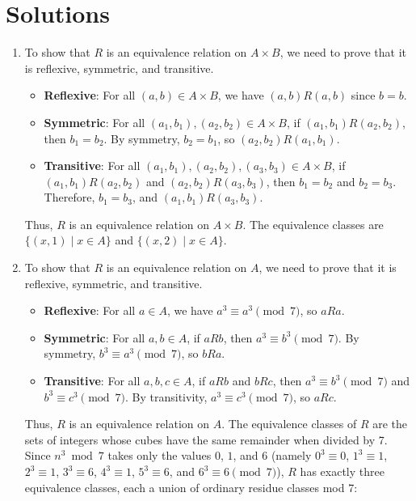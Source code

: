 
\section*{Solutions}

\begin{enumerate}
\item
To show that $R$ is an equivalence relation on $A \times B$, we need to prove that it is reflexive, symmetric, and transitive.

\begin{itemize}
\item \textbf{Reflexive}: For all $(a, b) \in A \times B$, we have $(a, b)R(a, b)$ since $b = b$.
\item \textbf{Symmetric}: For all $(a_1, b_1), (a_2, b_2) \in A \times B$, if $(a_1, b_1)R(a_2, b_2)$, then $b_1 = b_2$. By symmetry, $b_2 = b_1$, so $(a_2, b_2)R(a_1, b_1)$.
\item \textbf{Transitive}: For all $(a_1, b_1), (a_2, b_2), (a_3, b_3) \in A \times B$, if $(a_1, b_1)R(a_2, b_2)$ and $(a_2, b_2)R(a_3, b_3)$, then $b_1 = b_2$ and $b_2 = b_3$. Therefore, $b_1 = b_3$, and $(a_1, b_1)R(a_3, b_3)$.
\end{itemize}

Thus, $R$ is an equivalence relation on $A \times B$. The equivalence classes are $\{(x, 1) \mid x \in A\}$ and $\{(x, 2) \mid x \in A\}$.

\item
To show that $R$ is an equivalence relation on $A$, we need to prove that it is reflexive, symmetric, and transitive.

\begin{itemize}
\item \textbf{Reflexive}: For all $a \in A$, we have $a^3 \equiv a^3 \pmod{7}$, so $aRa$.
\item \textbf{Symmetric}: For all $a, b \in A$, if $aRb$, then $a^3 \equiv b^3 \pmod{7}$. By symmetry, $b^3 \equiv a^3 \pmod{7}$, so $bRa$.
\item \textbf{Transitive}: For all $a, b, c \in A$, if $aRb$ and $bRc$, then $a^3 \equiv b^3 \pmod{7}$ and $b^3 \equiv c^3 \pmod{7}$. By transitivity, $a^3 \equiv c^3 \pmod{7}$, so $aRc$.
\end{itemize}

Thus, $R$ is an equivalence relation on $A$. The equivalence classes of $R$ are the sets of integers whose cubes have the same remainder when divided by 7. Since $n^3 \bmod 7$ takes only the values $0$, $1$, and $6$ (namely $0^3 \equiv 0$, $1^3 \equiv 1$, $2^3 \equiv 1$, $3^3 \equiv 6$, $4^3 \equiv 1$, $5^3 \equiv 6$, and $6^3 \equiv 6 \pmod 7$), $R$ has exactly three equivalence classes, each a union of ordinary residue classes mod 7:


\end{enumerate}
